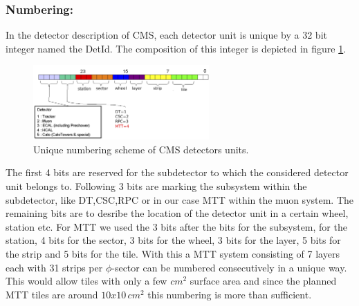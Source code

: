 			\subsubsection*{Numbering:}
			In the detector description of CMS, each detector unit is unique by a 32 bit integer named the DetId.
			The composition of this integer is depicted in figure \ref{fig:numbering}.
			\begin{figure}[htbp]
				\centering
				\includegraphics[width=0.6\textwidth]{Figures/erdogan/numbering.png}
				\caption{Unique numbering scheme of CMS detectors units.}
				\label{fig:numbering}
			\end{figure}
			The first 4 bits are reserved for the subdetector to which the considered detector unit belongs to.
			Following 3 bits are marking the subsystem within the subdetector, like DT,CSC,RPC or in our case MTT within the muon system.
			The remaining bits are to desribe the location of the detector unit in a certain wheel, station etc.
			For MTT we used the 3 bits after the bits for the subsystem, for the station, 4 bits for the sector, 3 bits for the wheel, 3 bits for the layer, 5 bits for the strip and 5 bits for the tile.
			With this a MTT system consisting of 7 layers each with 31 strips per $\phi$-sector can be numbered consecutively in a unique way.
			This would allow tiles with only a few $cm^2$ surface area and since the planned MTT tiles are around $10x10\,cm^2$ this numbering is more than sufficient.
